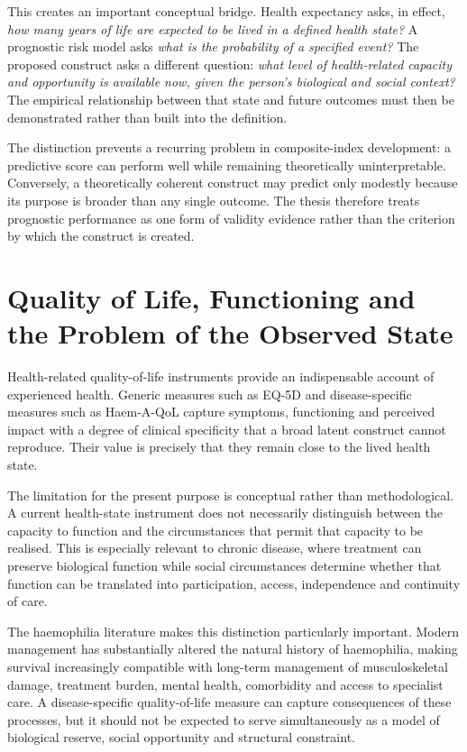 This creates an important conceptual bridge. Health expectancy asks, in effect, \emph{how many years of life are expected to be lived in a defined health state?} A prognostic risk model asks \emph{what is the probability of a specified event?} The proposed construct asks a different question: \emph{what level of health-related capacity and opportunity is available now, given the person's biological and social context?} The empirical relationship between that state and future outcomes must then be demonstrated rather than built into the definition.

The distinction prevents a recurring problem in composite-index development: a predictive score can perform well while remaining theoretically uninterpretable. Conversely, a theoretically coherent construct may predict only modestly because its purpose is broader than any single outcome. The thesis therefore treats prognostic performance as one form of validity evidence rather than the criterion by which the construct is created.

\section{Quality of Life, Functioning and the Problem of the Observed State}

Health-related quality-of-life instruments provide an indispensable account of experienced health. Generic measures such as EQ-5D and disease-specific measures such as Haem-A-QoL capture symptoms, functioning and perceived impact with a degree of clinical specificity that a broad latent construct cannot reproduce. Their value is precisely that they remain close to the lived health state.

The limitation for the present purpose is conceptual rather than methodological. A current health-state instrument does not necessarily distinguish between the capacity to function and the circumstances that permit that capacity to be realised. This is especially relevant to chronic disease, where treatment can preserve biological function while social circumstances determine whether that function can be translated into participation, access, independence and continuity of care.

The haemophilia literature makes this distinction particularly important. Modern management has substantially altered the natural history of haemophilia, making survival increasingly compatible with long-term management of musculoskeletal damage, treatment burden, mental health, comorbidity and access to specialist care. \cite{mauser_2009,srivastava_2020} A disease-specific quality-of-life measure can capture consequences of these processes, but it should not be expected to serve simultaneously as a model of biological reserve, social opportunity and structural constraint.

